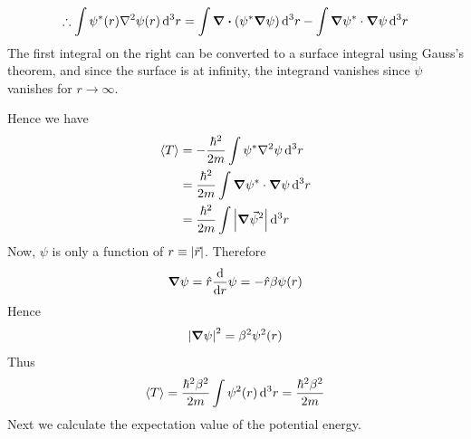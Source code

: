 	\begin{align}
		\therefore \int \psi^*\qty(r) \laplacian{\psi\qty(r)} \dd[3]{r} = \int \divergence \qty(\psi^* \grad{\psi}) \dd[3]{r} - \int \grad{\psi^*} \cdot \grad{\psi} \dd[3]{r}
		\end{align}
		The first integral on the right can be converted to a surface integral using Gauss's theorem, and since the surface is at infinity, the integrand vanishes since $\psi$ vanishes for $r \rightarrow \infty$.
		
		Hence we have
		\begin{align*}
			\expval{T} 
			&= -\frac{\hbar^2}{2 m} \int \psi^*\laplacian{\psi} \dd[3]{r} \\
			&= \frac{\hbar^2}{2 m} \int \grad{\psi^*} \cdot \grad{\psi} \dd[3]{r} \\
			&= \frac{\hbar^2}{2 m} \int \abs{\grad{\vec{\psi}}^2} \dd[3]{r}
		\end{align*}
		Now, $\psi$ is only a function of $r\equiv \abs{\vec{r}}$. Therefore
		\begin{align*}
			\grad{\psi} = \hat{r} \dv{}{r} \psi = -\hat{r} \beta \psi\qty(r)
		\end{align*}
		Hence
		\begin{align}
			\abs{\grad{\psi}}^2 = \beta^2 \psi^2\qty(r)
		\end{align}
		Thus
		\begin{align}
			\expval{T} = \frac{\hbar^2 \beta^2}{2 m} \int \psi^2\qty(r) \dd[3]{r} = \frac{\hbar^2 \beta^2}{2 m} 
		\end{align}
		Next we calculate the expectation value of the potential energy.
		
